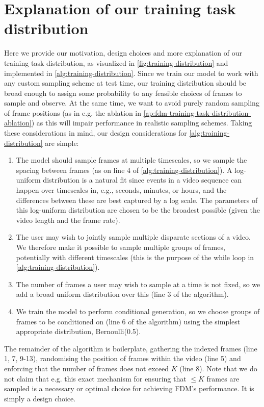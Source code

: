 \section{Explanation of our training task distribution} \label{app:training-task-dist-exp}
Here we provide our motivation, design choices and more explanation of our training task distribution, as visualized in \cref{fig:training-distribution} and implemented in \cref{alg:training-distribution}. Since we train our model to work with any custom sampling scheme at test time, our training distribution should be broad enough to assign some probability to any feasible choices of frames to sample and observe. At the same time, we want to avoid purely random sampling of frame positions (as in e.g. the ablation in \cref{ap:fdm-training-task-distribution-ablation}) as this will impair performance in realistic sampling schemes. Taking these considerations in mind, our design considerations for \cref{alg:training-distribution} are simple:
\begin{enumerate}
    \item The model should sample frames at multiple timescales, so we sample the spacing between frames (as on line 4 of \cref{alg:training-distribution}). A log-uniform distribution is a natural fit since events in a video sequence can happen over timescales in, e.g., seconds, minutes, or hours, and the differences between these are best captured by a log scale. The parameters of this log-uniform distribution are chosen to be the broadest possible (given the video length and the frame rate).
    \item The user may wish to jointly sample multiple disparate sections of a video. We therefore make it possible to sample multiple groups of frames, potentially with different timescales (this is the purpose of the while loop in \cref{alg:training-distribution}).
    \item The number of frames a user may wish to sample at a time is not fixed, so we add a broad uniform distribution over this (line 3 of the algorithm).
    \item We train the model to perform conditional generation, so we choose groups of frames to be conditioned on (line 6 of the algorithm) using the simplest appropriate distribution, Bernoulli(0.5).
\end{enumerate}
The remainder of the algorithm is boilerplate, gathering the indexed frames (line 1, 7, 9-13), randomising the position of frames within the video (line 5) and enforcing that the number of frames does not exceed $K$ (line 8). Note that we do not claim that e.g. this exact mechanism for ensuring that $\leq K$ frames are sampled is a necessary or optimal choice for achieving FDM’s performance. It is simply a design choice.


